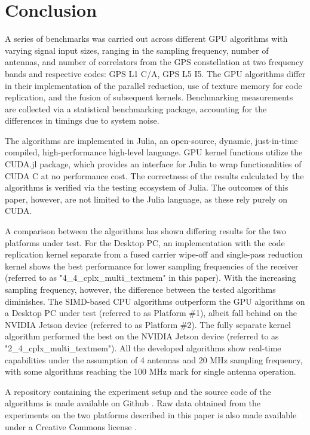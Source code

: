 \documentclass{juliacon}
\begin{document}
\section{Conclusion}\label{sec:conclusion}
A series of benchmarks was carried out across different GPU algorithms with varying signal input sizes, ranging in the sampling frequency, number of antennas, and number of correlators from the GPS constellation at two frequency bands and respective codes: GPS L1 C/A, GPS L5 I5. The GPU algorithms differ in their implementation of the parallel reduction, use of texture memory for code replication, and the fusion of subsequent kernels. Benchmarking measurements are collected via a statistical benchmarking package, accounting for the differences in timings due to system noise.

The algorithms are implemented in Julia, an open-source, dynamic, just-in-time compiled, high-performance high-level language. GPU kernel functions utilize the CUDA.jl package, which provides an interface for Julia to wrap functionalities of CUDA C at no performance cost. The correctness of the results calculated by the algorithms is verified via the testing ecosystem of Julia. The outcomes of this paper, however, are not limited to the Julia language, as these rely purely on CUDA.

A comparison between the algorithms has shown differing results for the two platforms under test. For the Desktop PC, an implementation with the code replication kernel separate from a fused carrier wipe-off and single-pass reduction kernel shows the best performance for lower sampling frequencies of the receiver (referred to as "4\_4\_cplx\_multi\_textmem" in this paper). With the increasing sampling frequency, however, the difference between the tested algorithms diminishes. The SIMD-based CPU algorithms outperform the GPU algorithms on a Desktop PC under test (referred to as Platform \#1), albeit fall behind on the NVIDIA Jetson device (referred to as Platform \#2). The fully separate kernel algorithm performed the best on the NVIDIA Jetson device (referred to as "2\_4\_cplx\_multi\_textmem"). All the developed algorithms show real-time capabilities under the assumption of  4 antennas and 20 MHz sampling frequency, with some algorithms reaching the 100 MHz mark for single antenna operation.

A repository containing the experiment setup and the source code of the algorithms is made available on Github \cite{Ozmaden2022}. Raw data obtained from the experiments on the two platforms described in this paper is also made available under a Creative Commons license \cite{Ozmaden2022_2}.
\end{document}
